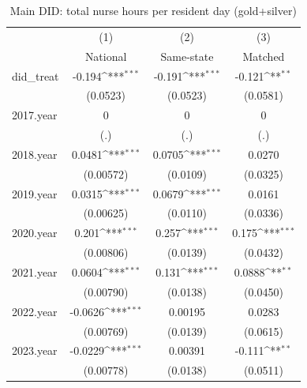 \begin{table}[htbp]\centering
\def\sym#1{\ifmmode^{#1}\else\(^{#1}\)\fi}
\caption{Main DID: total nurse hours per resident day (gold+silver)}
\begin{tabular}{l*{3}{c}}
\hline\hline
                    &\multicolumn{1}{c}{(1)}&\multicolumn{1}{c}{(2)}&\multicolumn{1}{c}{(3)}\\
                    &\multicolumn{1}{c}{National}&\multicolumn{1}{c}{Same-state}&\multicolumn{1}{c}{Matched}\\
\hline
did\_treat           &      -0.194\sym{***}&      -0.191\sym{***}&      -0.121\sym{**} \\
                    &    (0.0523)         &    (0.0523)         &    (0.0581)         \\
[1em]
2017.year           &           0         &           0         &           0         \\
                    &         (.)         &         (.)         &         (.)         \\
[1em]
2018.year           &      0.0481\sym{***}&      0.0705\sym{***}&      0.0270         \\
                    &   (0.00572)         &    (0.0109)         &    (0.0325)         \\
[1em]
2019.year           &      0.0315\sym{***}&      0.0679\sym{***}&      0.0161         \\
                    &   (0.00625)         &    (0.0110)         &    (0.0336)         \\
[1em]
2020.year           &       0.201\sym{***}&       0.257\sym{***}&       0.175\sym{***}\\
                    &   (0.00806)         &    (0.0139)         &    (0.0432)         \\
[1em]
2021.year           &      0.0604\sym{***}&       0.131\sym{***}&      0.0888\sym{**} \\
                    &   (0.00790)         &    (0.0138)         &    (0.0450)         \\
[1em]
2022.year           &     -0.0626\sym{***}&     0.00195         &      0.0283         \\
                    &   (0.00769)         &    (0.0139)         &    (0.0615)         \\
[1em]
2023.year           &     -0.0229\sym{***}&     0.00391         &      -0.111\sym{**} \\
                    &   (0.00778)         &    (0.0138)         &    (0.0511)         \\

\end{tabular}
\end{table}
